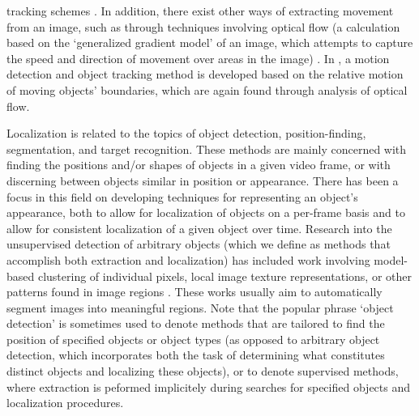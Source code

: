 \documentclass[twocolumn, final]{svjour3}
\begin{document}
tracking schemes \citep{perez_2002}. In addition, there exist other ways of extracting movement from an image, such as through techniques involving optical flow (a calculation based on the `generalized gradient model' of an image, which attempts to capture the speed and direction of movement over areas in the image) \citep{horn_1981, bobick_2001}. In \citep{black_2000}, a motion detection and object tracking method is developed based on the relative motion of moving objects' boundaries, which are again found through analysis of optical flow.

Localization is related to the topics of object detection, position-finding, segmentation, and target recognition. These methods are mainly concerned with finding the positions and/or shapes of objects in a given video frame, or with discerning between objects similar in position or appearance. There has been a focus in this field on developing techniques for representing an object's appearance, both to allow for localization of objects on a per-frame basis and to allow for consistent localization of a given object over time. Research into the unsupervised detection of arbitrary objects (which we define as methods that accomplish both extraction and localization) has included work involving model-based clustering of individual pixels, local image texture representations, or other patterns found in image regions \cite{jain1997object, fei2005bayesian, sivic2005discovering}. These works usually aim to automatically segment images into meaningful regions. Note that the popular phrase `object detection' is sometimes used to denote methods that are tailored to find the position of specified objects or object types (as opposed to arbitrary object detection, which incorporates both the task of determining what constitutes distinct objects and localizing these objects), or to denote supervised methods, where extraction is peformed implicitely during searches for specified objects and localization procedures.
\end{document}
